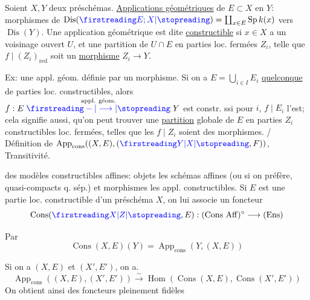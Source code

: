 Soient $X,Y$ deux préschémas. \uline{Applications géométriques} de $E\subset X$ en $Y$: morphismes de $\operatorname{Dis}(\unsure{E;X})=\coprod_{x\in E}\operatorname{Sp}k(x)$ vers $\operatorname{Dis}(Y)$.  Une application géométrique est dite \uline{constructible} si  $x\in X$ a un voisinage ouvert  $U$, et une partition de $U\cap E$ en parties loc. fermées $Z_i$, telle que $f\mid(Z_i)_{\mathrm{red}}$ soit un \uline{morphisme} $Z_i\longrightarrow Y$. 

Ex: une appl. géom. définie par un morphisme. Si on a $E=\bigcup_{i\in I}E_i$  \uline{quelconque} de parties loc. constructibles, alors $f:E\mathrel{\overset{\text{appl. géom.}}{\unsure{-|\longrightarrow}}}Y$ est constr. ssi pour \unsure{$\forall$} $i$, $f\mid E_i$ l'est; cela signifie aussi,  qu'on peut trouver une \uline{partition} globale de $E$ en parties $Z_i$ constructibles loc. fermées, telles que les $f\mid Z_i$ soient des morphismes. / Définition de $\operatorname{App}_{\mathrm{cons}}((X,E),(\unsure{Y|X},F))$, Transitivité.

  des modèles constructibles affines: objets les schémas affines (ou si on préfère, quasi-compacts q. sép.) et morphismes les appl. constructibles. Si $E$ est une partie loc.  constructible d'un préschéma $X$, on lui associe un foncteur
\[
\operatorname{Cons}(\unsure{X|Z},E):(\mathrm{Cons\ Aff})^\circ\longrightarrow(\mathrm{Ens})
\]

Par
\[
\operatorname{Cons}(X,E)(Y)=\operatorname{App}_{\mathrm{cons}}(Y,(X,E))
\]

Si on a $(X,E)$ et $(X',E')$, on a.
\[
\operatorname{App}_{\mathrm{cons}}((X,E),(X',E'))\xrightarrow{\sim}\operatorname{Hom}(\operatorname{Cons}(X,E),\operatorname{Cons}(X',E'))
\]
On obtient ainsi des foncteurs pleinement fidèles


